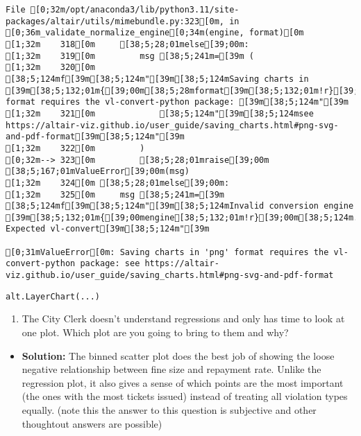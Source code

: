 \documentclass[
  letterpaper,
  DIV=11,
  numbers=noendperiod]{scrartcl}
\providecommand{\tightlist}{%
  \setlength{\itemsep}{0pt}\setlength{\parskip}{0pt}}\usepackage{longtable,booktabs,array}
\begin{document}
\begin{verbatim}
File [0;32m/opt/anaconda3/lib/python3.11/site-packages/altair/utils/mimebundle.py:323[0m, in [0;36m_validate_normalize_engine[0;34m(engine, format)[0m
[1;32m    318[0m     [38;5;28;01melse[39;00m:
[1;32m    319[0m         msg [38;5;241m=[39m (
[1;32m    320[0m             [38;5;124mf[39m[38;5;124m"[39m[38;5;124mSaving charts in [39m[38;5;132;01m{[39;00m[38;5;28mformat[39m[38;5;132;01m!r}[39;00m[38;5;124m format requires the vl-convert-python package: [39m[38;5;124m"[39m
[1;32m    321[0m             [38;5;124m"[39m[38;5;124msee https://altair-viz.github.io/user_guide/saving_charts.html#png-svg-and-pdf-format[39m[38;5;124m"[39m
[1;32m    322[0m         )
[0;32m--> 323[0m         [38;5;28;01mraise[39;00m [38;5;167;01mValueError[39;00m(msg)
[1;32m    324[0m [38;5;28;01melse[39;00m:
[1;32m    325[0m     msg [38;5;241m=[39m [38;5;124mf[39m[38;5;124m"[39m[38;5;124mInvalid conversion engine [39m[38;5;132;01m{[39;00mengine[38;5;132;01m!r}[39;00m[38;5;124m. Expected vl-convert[39m[38;5;124m"[39m

[0;31mValueError[0m: Saving charts in 'png' format requires the vl-convert-python package: see https://altair-viz.github.io/user_guide/saving_charts.html#png-svg-and-pdf-format
\end{verbatim}

\begin{verbatim}
alt.LayerChart(...)
\end{verbatim}

\begin{enumerate}
\def\labelenumi{\arabic{enumi}.}
\setcounter{enumi}{2}
\tightlist
\item
  The City Clerk doesn't understand regressions and only has time to
  look at one plot. Which plot are you going to bring to them and why?
\end{enumerate}

\begin{itemize}
\tightlist
\item
  \textbf{Solution:} The binned scatter plot does the best job of
  showing the loose negative relationship between fine size and
  repayment rate. Unlike the regression plot, it also gives a sense of
  which points are the most important (the ones with the most tickets
  issued) instead of treating all violation types equally. (note this
  the answer to this question is subjective and other thoughtout answers
  are possible)
\end{itemize}
\end{document}
